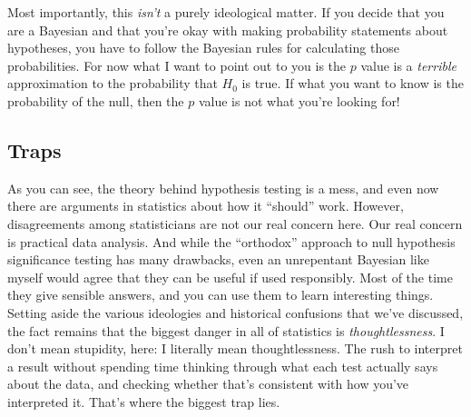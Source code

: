 \documentclass[
]{book}
\begin{document}
Most importantly, this \emph{isn't} a purely ideological matter. If you decide that you are a Bayesian and that you're okay with making probability statements about hypotheses, you have to follow the Bayesian rules for calculating those probabilities. For now what I want to point out to you is the \(p\) value is a \emph{terrible} approximation to the probability that \(H_0\) is true. If what you want to know is the probability of the null, then the \(p\) value is not what you're looking for!

\hypertarget{traps}{%
\subsection{Traps}\label{traps}}

As you can see, the theory behind hypothesis testing is a mess, and even now there are arguments in statistics about how it ``should'' work. However, disagreements among statisticians are not our real concern here. Our real concern is practical data analysis. And while the ``orthodox'' approach to null hypothesis significance testing has many drawbacks, even an unrepentant Bayesian like myself would agree that they can be useful if used responsibly. Most of the time they give sensible answers, and you can use them to learn interesting things. Setting aside the various ideologies and historical confusions that we've discussed, the fact remains that the biggest danger in all of statistics is \emph{thoughtlessness}. I don't mean stupidity, here: I literally mean thoughtlessness. The rush to interpret a result without spending time thinking through what each test actually says about the data, and checking whether that's consistent with how you've interpreted it. That's where the biggest trap lies.
\end{document}
